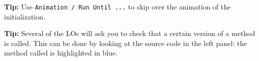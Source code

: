 \textbf{Tip:} Use \texttt{Animation / Run Until ...} to skip over the animation
of the initialization.

\textbf{Tip:} Several of the LOs will ask you to check that a certain version
of a method is called. This can be done by looking at the source code in the left panel:
the method called is highlighted in blue.










